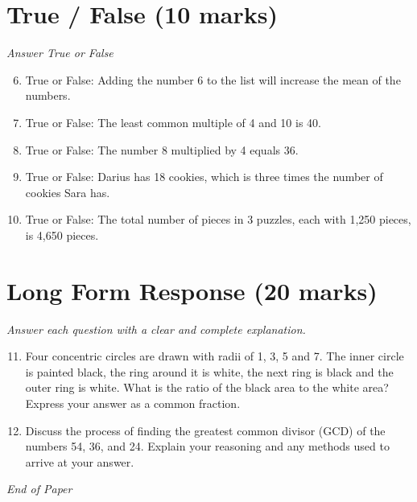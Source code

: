\documentclass[12pt]{article}
\begin{document}
\section*{True / False (10 marks)}
\textit{Answer True or False}
\begin{enumerate}[label=\arabic*.]
\setcounter{enumi}{5}
\item True or False: Adding the number 6 to the list will increase the mean of the numbers.
\item True or False: The least common multiple of 4 and 10 is 40.
\item True or False: The number 8 multiplied by 4 equals 36.
\item True or False: Darius has 18 cookies, which is three times the number of cookies Sara has.
\item True or False: The total number of pieces in 3 puzzles, each with 1,250 pieces, is 4,650 pieces.
\end{enumerate}

\section*{Long Form Response (20 marks)}
\textit{Answer each question with a clear and complete explanation.}
\begin{enumerate}[label=\arabic*.]
\setcounter{enumi}{10}
\item Four concentric circles are drawn with radii of 1, 3, 5 and 7. The inner circle is painted black, the ring around it is white, the next ring is black and the outer ring is white. What is the ratio of the black area to the white area? Express your answer as a common fraction.
\item Discuss the process of finding the greatest common divisor (GCD) of the numbers 54, 36, and 24. Explain your reasoning and any methods used to arrive at your answer.
\end{enumerate}

\vfill
\noindent\textit{End of Paper}
\end{document}

